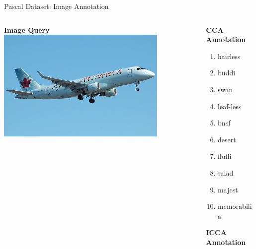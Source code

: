 \documentclass[8pt]{beamer}
\begin{document}
\begin{frame}{Pascal Dataset: Image Annotation}

\begin{columns}[T]
  \begin{column}{0.5\textwidth}
	\centering
    \textbf{Image Query}\\
	\includegraphics[width=0.8\textwidth]{figures/img_27.jpg}
  \end{column}
  \begin{column}{0.5\textwidth}
    \begin{minipage}[t]{0.4\textwidth}
      \small
      \begin{center}
        \textbf{CCA Annotation}
      \end{center}
      \begin{enumerate}
      \item hairless
      \item buddi
      \item swan
      \item leaf-less
      \item bnsf
      \item desert
      \item fluffi
      \item salad
      \item majest
      \item memorabilia
      \end{enumerate}
    \end{minipage}%
    \begin{minipage}[t]{0.1\textwidth}
    \end{minipage}
    \begin{minipage}[t]{0.4\textwidth}
      \small
      \begin{center}
        \textbf{ICCA Annotation}
      \end{center}

\end{minipage}
\end{column}
\end{columns}
\end{frame}
\end{document}
